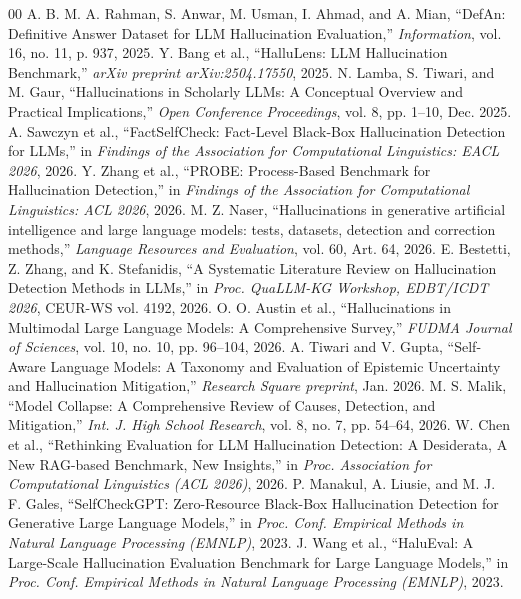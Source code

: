 \documentclass[conference]{IEEEtran}
\begin{document}
\begin{thebibliography}{00}
 A. B. M. A. Rahman, S. Anwar, M. Usman, I. Ahmad, and A. Mian, ``DefAn: Definitive Answer Dataset for LLM Hallucination Evaluation,'' \textit{Information}, vol. 16, no. 11, p. 937, 2025.
 Y. Bang et al., ``HalluLens: LLM Hallucination Benchmark,'' \textit{arXiv preprint arXiv:2504.17550}, 2025.
 N. Lamba, S. Tiwari, and M. Gaur, ``Hallucinations in Scholarly LLMs: A Conceptual Overview and Practical Implications,'' \textit{Open Conference Proceedings}, vol. 8, pp. 1--10, Dec. 2025.
 A. Sawczyn et al., ``FactSelfCheck: Fact-Level Black-Box Hallucination Detection for LLMs,'' in \textit{Findings of the Association for Computational Linguistics: EACL 2026}, 2026.
 Y. Zhang et al., ``PROBE: Process-Based Benchmark for Hallucination Detection,'' in \textit{Findings of the Association for Computational Linguistics: ACL 2026}, 2026.
 M. Z. Naser, ``Hallucinations in generative artificial intelligence and large language models: tests, datasets, detection and correction methods,'' \textit{Language Resources and Evaluation}, vol. 60, Art. 64, 2026.
 E. Bestetti, Z. Zhang, and K. Stefanidis, ``A Systematic Literature Review on Hallucination Detection Methods in LLMs,'' in \textit{Proc. QuaLLM-KG Workshop, EDBT/ICDT 2026}, CEUR-WS vol. 4192, 2026.
 O. O. Austin et al., ``Hallucinations in Multimodal Large Language Models: A Comprehensive Survey,'' \textit{FUDMA Journal of Sciences}, vol. 10, no. 10, pp. 96--104, 2026.
 A. Tiwari and V. Gupta, ``Self-Aware Language Models: A Taxonomy and Evaluation of Epistemic Uncertainty and Hallucination Mitigation,'' \textit{Research Square preprint}, Jan. 2026.
 M. S. Malik, ``Model Collapse: A Comprehensive Review of Causes, Detection, and Mitigation,'' \textit{Int. J. High School Research}, vol. 8, no. 7, pp. 54--64, 2026.
 W. Chen et al., ``Rethinking Evaluation for LLM Hallucination Detection: A Desiderata, A New RAG-based Benchmark, New Insights,'' in \textit{Proc. Association for Computational Linguistics (ACL 2026)}, 2026.
 P. Manakul, A. Liusie, and M. J. F. Gales, ``SelfCheckGPT: Zero-Resource Black-Box Hallucination Detection for Generative Large Language Models,'' in \textit{Proc. Conf. Empirical Methods in Natural Language Processing (EMNLP)}, 2023.
 J. Wang et al., ``HaluEval: A Large-Scale Hallucination Evaluation Benchmark for Large Language Models,'' in \textit{Proc. Conf. Empirical Methods in Natural Language Processing (EMNLP)}, 2023.

\end{thebibliography}
\end{document}
